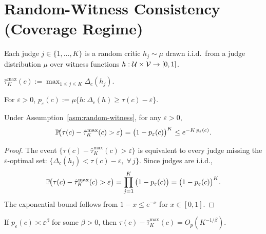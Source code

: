 \section{Random-Witness Consistency (Coverage Regime)}
\label{sec:coverage}

\begin{assumption}
\label{asm:random-witness}
Each judge $j \in \{1, \ldots, K\}$ is a random critic $h_j \sim \mu$
drawn i.i.d.\ from a judge distribution $\mu$ over witness functions
$h : \mathcal{U} \times \mathcal{V} \to [0,1]$.
\end{assumption}

\begin{definition}
\label{def:best-of-K}
$\hat\tau^{\max}_K(c) := \max_{1 \le j \le K} \Delta_c(h_j).$
\end{definition}

\begin{definition}
\label{def:near-optimal-mass}
For $\varepsilon > 0$,\;
$p_\varepsilon(c) := \mu\!\big\{h : \Delta_c(h) \ge \tau(c) - \varepsilon\big\}.$
\end{definition}

\begin{theorem}
\label{thm:coverage}
Under Assumption~\ref{asm:random-witness}, for any $\varepsilon > 0$,
\begin{equation}
\label{eq:coverage}
\mathbb{P}\!\big(\tau(c) - \hat\tau^{\max}_K(c) > \varepsilon\big)
= \big(1 - p_\varepsilon(c)\big)^K
\le e^{-K \, p_\varepsilon(c)}.
\end{equation}
\end{theorem}

\begin{proof}
The event $\{\tau(c) - \hat\tau^{\max}_K(c) > \varepsilon\}$ is equivalent
to every judge missing the $\varepsilon$-optimal set:
$\{\Delta_c(h_j) < \tau(c) - \varepsilon,\; \forall\, j\}$.
Since judges are i.i.d.,
\begin{equation}
\mathbb{P}\!\big(\tau(c) - \hat\tau^{\max}_K(c) > \varepsilon\big)
= \prod_{j=1}^K \big(1 - p_\varepsilon(c)\big)
= \big(1 - p_\varepsilon(c)\big)^K.
\end{equation}
The exponential bound follows from $1 - x \le e^{-x}$ for $x \in [0,1]$.
\end{proof}

\begin{corollary}
\label{cor:scaling-law-coverage}
If $p_\varepsilon(c) \asymp \varepsilon^\beta$ for some $\beta > 0$, then
$\tau(c) - \hat\tau^{\max}_K(c) = O_p(K^{-1/\beta})$.
\end{corollary}

